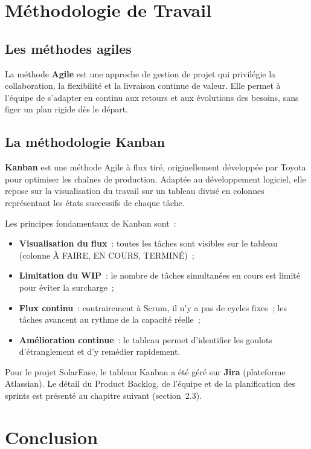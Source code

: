 \section{Méthodologie de Travail}

\subsection{Les méthodes agiles}

La méthode \textbf{Agile} est une approche de gestion de projet qui privilégie
la collaboration, la flexibilité et la livraison continue de valeur. Elle permet
à l'équipe de s'adapter en continu aux retours et aux évolutions des besoins,
sans figer un plan rigide dès le départ.

\subsection{La méthodologie Kanban}

\textbf{Kanban} est une méthode Agile à flux tiré, originellement développée
par Toyota pour optimiser les chaînes de production. Adaptée au développement
logiciel, elle repose sur la visualisation du travail sur un tableau divisé en
colonnes représentant les états successifs de chaque tâche.

Les principes fondamentaux de Kanban sont~:
\begin{itemize}
  \item \textbf{Visualisation du flux}~: toutes les tâches sont visibles
    sur le tableau (colonne À FAIRE, EN COURS, TERMINÉ)~;
  \item \textbf{Limitation du WIP}~: le nombre de tâches simultanées en
    cours est limité pour éviter la surcharge~;
  \item \textbf{Flux continu}~: contrairement à Scrum, il n'y a pas de
    cycles fixes~; les tâches avancent au rythme de la capacité réelle~;
  \item \textbf{Amélioration continue}~: le tableau permet d'identifier
    les goulots d'étranglement et d'y remédier rapidement.
\end{itemize}

Pour le projet SolarEase, le tableau Kanban a été géré sur \textbf{Jira}
(plateforme Atlassian). Le détail du Product Backlog, de l'équipe et de la
planification des sprints est présenté au chapitre suivant (section~2.3).

\section*{Conclusion}

